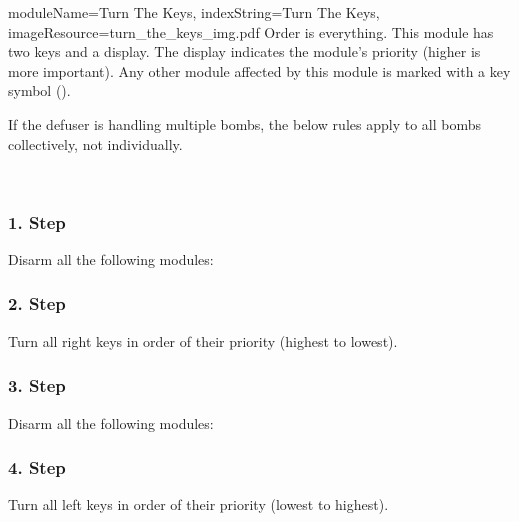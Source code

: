 \documentclass{../../ktane-mod}
\begin{document}
\begin{module}{
  moduleName=Turn The Keys,
  indexString=Turn The Keys,
  imageResource=turn_the_keys_img.pdf
}
{
  Order is everything.
}
  This module has two keys and a display.
  The display indicates the module's priority (higher is more important).
  Any other module affected by this module is marked with a key symbol (\keysymbol).

  If the defuser is handling multiple bombs, the below rules apply to all bombs collectively, not individually.

  \medskip\\
  \begin{multicols}{2}
  \begin{bulletlist}
  \end{bulletlist}
  \end{multicols}

  \subsubsection*{1. Step}
  Disarm all the following modules:
  \begin{multicols}{2}
    \begin{bulletlist}
    \end{bulletlist}
  \end{multicols}

  \subsubsection*{2. Step}
  Turn all right keys in order of their priority (highest to lowest).

  \subsubsection*{3. Step}
  Disarm all the following modules:
  \begin{multicols}{2}
    \begin{bulletlist}
    \end{bulletlist}
  \end{multicols}

  \subsubsection*{4. Step}
  Turn all left keys in \YELLOW[reverse] order of their priority (lowest to highest).
\end{module}
\end{document}
